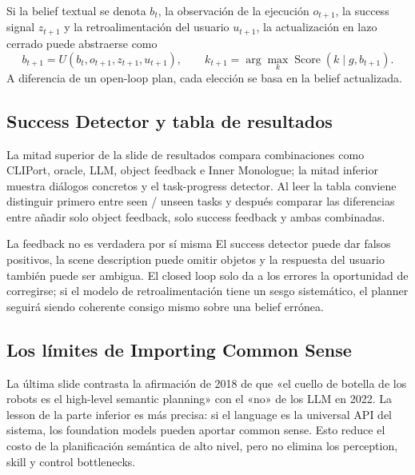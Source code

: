 
Si la belief textual se denota $b_t$, la observación de la ejecución $o_{t+1}$, la success signal $z_{t+1}$ y la retroalimentación del usuario $u_{t+1}$, la actualización en lazo cerrado puede abstraerse como
\begin{equation}
b_{t+1}=U(b_t,o_{t+1},z_{t+1},u_{t+1}),
\qquad
k_{t+1}=\arg\max_k \operatorname{Score}(k\mid g,b_{t+1}).
\end{equation}
A diferencia de un open-loop plan, cada elección se basa en la belief actualizada.

\subsection{Success Detector y tabla de resultados}

La mitad superior de la slide de resultados compara combinaciones como CLIPort, oracle, LLM, object feedback e Inner Monologue; la mitad inferior muestra diálogos concretos y el task-progress detector. Al leer la tabla conviene distinguir primero entre seen / unseen tasks y después comparar las diferencias entre añadir solo object feedback, solo success feedback y ambas combinadas.


\begin{warningbox}{La feedback no es verdadera por sí misma}
El success detector puede dar falsos positivos, la scene description puede omitir objetos y la respuesta del usuario también puede ser ambigua. El closed loop solo da a los errores la oportunidad de corregirse; si el modelo de retroalimentación tiene un sesgo sistemático, el planner seguirá siendo coherente consigo mismo sobre una belief errónea.
\end{warningbox}

\subsection{Los límites de Importing Common Sense}

La última slide contrasta la afirmación de 2018 de que «el cuello de botella de los robots es el high-level semantic planning» con el «no» de los LLM en 2022. La lesson de la parte inferior es más precisa: si el language es la universal API del sistema, los foundation models pueden aportar common sense. Esto reduce el costo de la planificación semántica de alto nivel, pero no elimina los perception, skill y control bottlenecks.

